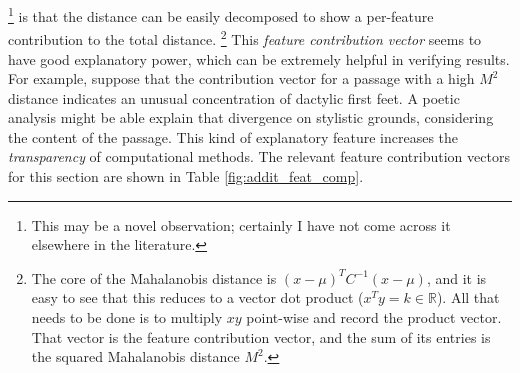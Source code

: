 \documentclass[11pt,a4paper]{scrartcl} %
\begin{document}
{\footnote{This may be a novel observation; certainly I have not come across it elsewhere in the literature.}
is that the distance can be easily decomposed to show a per-feature contribution to the total distance.%
\footnote{The core of the Mahalanobis distance is $(x-\mu)^{T}C^{-1}(x-\mu)$, and it is easy to see that this reduces to a vector dot product ($x^{T}y=k \in \mathbb{R}$). All that needs to be done is to multiply $xy$ point-wise and record the product vector. That vector is the feature contribution vector, and the sum of its entries is the squared Mahalanobis distance $M^{2}$.}
This \textit{feature contribution vector} seems to have good explanatory power, which can be extremely helpful in verifying results. For example, suppose that the contribution vector for a passage with a high $M^{2}$ distance indicates an unusual concentration of dactylic first feet. A poetic analysis might be able explain that divergence on stylistic grounds, considering the content of the passage. This kind of explanatory feature increases the \textit{transparency} of computational methods. The relevant feature contribution vectors for this section are shown in Table \ref{fig:addit_feat_comp}.

\begin{table}
\caption{Feature contribution vectors and Mahalanobis distance ($M^{2}$) when comparing the Additamentum to Silius' \textit{Punica} and Vergil's \textit{Aeneid}. For comparison, distance from the centroid of the \textit{Aeneid} to the \textit{Punica}.}
\label{fig:addit_feat_comp}
\phantom{x}
\centering
{}
\end{table}

}
\end{document}
